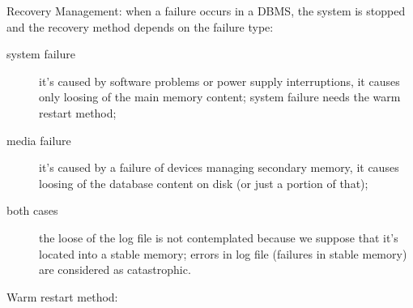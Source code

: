 Recovery Management: when a failure occurs in a DBMS, the system is stopped and the recovery method depends on the failure type:
\begin{description}
	\item[system failure] it's caused by software problems or power supply interruptions, it causes only loosing of the main memory content; system failure needs the warm restart method;
	\item[media failure] it's caused by a failure of devices managing secondary memory, it causes loosing of the database content on disk (or just a portion of that);
	\item[both cases] the loose of the log file is not contemplated because we suppose that it's located into a stable memory; errors in log file (failures in stable memory) are considered as catastrophic.
\end{description}
Warm restart method:
